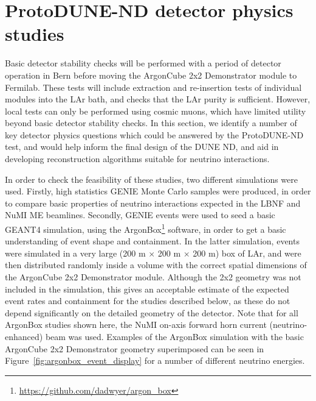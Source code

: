 \section{ProtoDUNE-ND detector physics studies}
\label{sec:detector-physics-studies}
Basic detector stability checks will be performed with a period of detector operation in Bern before moving the ArgonCube 2x2 Demonstrator module to Fermilab. These tests will include extraction and re-insertion tests of individual modules into the LAr bath, and checks that the LAr purity is sufficient. However, local tests can only be performed using cosmic muons, which have limited utility beyond basic detector stability checks. In this section, we identify a number of key detector physics questions which could be answered by the ProtoDUNE-ND test, and would help inform the final design of the DUNE ND, and aid in developing reconstruction algorithms suitable for neutrino interactions.

In order to check the feasibility of these studies, two different simulations were used. Firstly, high statistics GENIE Monte Carlo samples were produced, in order to compare basic properties of neutrino interactions expected in the LBNF and NuMI ME beamlines. Secondly, GENIE events were used to seed a basic GEANT4 simulation, using the ArgonBox\footnote{\url{https://github.com/dadwyer/argon_box}} software, in order to get a basic understanding of event shape and containment. In the latter simulation, events were simulated in a very large (200 m $\times$ 200 m $\times$ 200 m) box of LAr, and were then distributed randomly inside a volume with the correct spatial dimensions of the ArgonCube 2x2 Demonstrator module. Although the 2x2 geometry was not included in the simulation, this gives an acceptable estimate of the expected event rates and containment for the studies described below, as these do not depend significantly on the detailed geometry of the detector. Note that for all ArgonBox studies shown here, the NuMI on-axis forward horn current (neutrino-enhanced) beam was used. Examples of the ArgonBox simulation with the basic ArgonCube 2x2 Demonstrator geometry superimposed can be seen in Figure~\ref{fig:argonbox_event_display} for a number of different neutrino energies.

